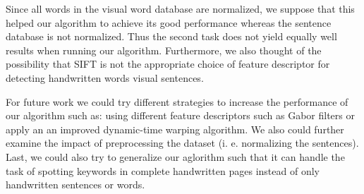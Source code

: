 \documentclass[conference]{IEEEtran}
\begin{document}
Since all words in the visual word database are normalized, we suppose that this helped our algorithm to achieve its good performance whereas the sentence database is not normalized. Thus the second task does not yield equally well results when running our algorithm. Furthermore, we also thought of the possibility that SIFT is not the appropriate choice of feature descriptor for detecting handwritten words visual sentences. 

For future work we could try different strategies to increase the performance of our algorithm such as: using different feature descriptors such as Gabor filters or apply an an improved dynamic-time warping algorithm. 
We also could further examine the impact of preprocessing the dataset (i. e. normalizing the sentences). 
Last, we could also try to generalize our aglorithm such that it can handle the task of spotting keywords in complete handwritten pages instead of only handwritten sentences or words. 


%
%



%
%
\end{document}
